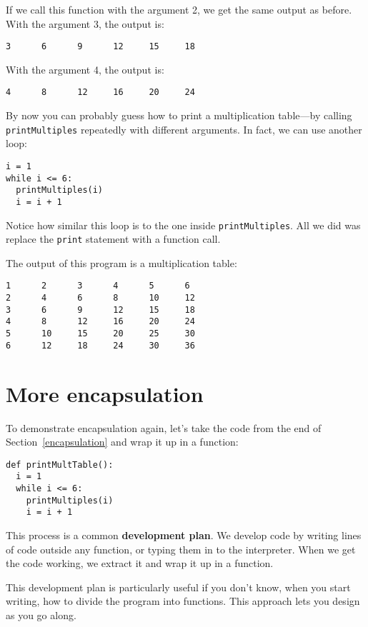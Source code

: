 If we call this function with the argument 2, we get the same output as
before.  With the argument 3, the output is:

\beforeverb
\begin{verbatim}
3      6      9      12     15     18
\end{verbatim}
\afterverb
%
With the argument 4, the output is:

\beforeverb
\begin{verbatim}
4      8      12     16     20     24
\end{verbatim}
\afterverb
%
By now you can probably guess how to print a multiplication table---by
calling {\tt printMultiples} repeatedly with different arguments.  In
fact, we can use another loop:

\beforeverb
\begin{verbatim}
i = 1
while i <= 6:
  printMultiples(i)
  i = i + 1
\end{verbatim}
\afterverb
%
Notice how similar this loop is to the one inside
{\tt printMultiples}.  All we did was replace the {\tt print} statement with
a function call.

The output of this program is a multiplication table:

\beforeverb
\begin{verbatim}
1      2      3      4      5      6
2      4      6      8      10     12
3      6      9      12     15     18
4      8      12     16     20     24
5      10     15     20     25     30
6      12     18     24     30     36
\end{verbatim}
\afterverb
%


\section{More encapsulation}

To demonstrate encapsulation again, let's take the code from the end of
Section~\ref{encapsulation} and wrap it up in a function:

\beforeverb
\begin{verbatim}
def printMultTable():
  i = 1
  while i <= 6:
    printMultiples(i)
    i = i + 1
\end{verbatim}
\afterverb
%
This process is a common {\bf development plan}.  We develop code by
writing lines of code outside any function, or typing them in to the
interpreter.  When we get the code working, we extract it and wrap it
up in a function.

This development plan is particularly useful if you don't know, when
you start writing, how to divide the program into functions.  This
approach lets you design as you go along.

